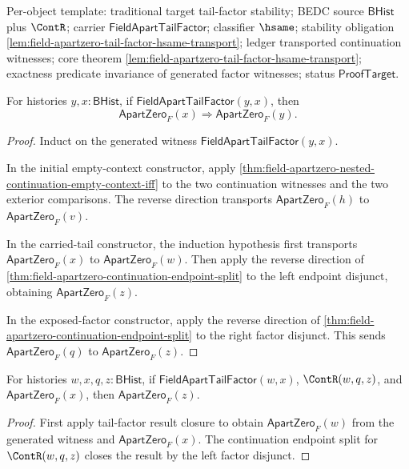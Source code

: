 
Per-object template: traditional target tail-factor stability; BEDC source
$\mathsf{BHist}$ plus $\ContR$; carrier $\mathsf{FieldApartTailFactor}$;
classifier $\hsame$; stability obligation
\autoref{lem:field-apartzero-tail-factor-hsame-transport}; ledger transported
continuation witnesses; core theorem
\autoref{lem:field-apartzero-tail-factor-hsame-transport}; exactness predicate invariance of generated factor witnesses; status $\mathsf{ProofTarget}$.


\begin{lemma}
\label{lem:field-apartzero-tail-factor-result-closure}
For histories $y,x:\mathsf{BHist}$, if
$\mathsf{FieldApartTailFactor}(y,x)$, then
$$
\mathsf{ApartZero}_F(x)\Rightarrow\mathsf{ApartZero}_F(y).
$$
\end{lemma}
\begin{proof}
Induct on the generated witness
$\mathsf{FieldApartTailFactor}(y,x)$.

In the initial empty-context constructor, apply
\autoref{thm:field-apartzero-nested-continuation-empty-context-iff} to the
two continuation witnesses and the two exterior comparisons. The reverse
direction transports $\mathsf{ApartZero}_F(h)$ to
$\mathsf{ApartZero}_F(v)$.

In the carried-tail constructor, the induction hypothesis first transports
$\mathsf{ApartZero}_F(x)$ to $\mathsf{ApartZero}_F(w)$. Then apply the
reverse direction of
\autoref{thm:field-apartzero-continuation-endpoint-split} to the left
endpoint disjunct, obtaining $\mathsf{ApartZero}_F(z)$.

In the exposed-factor constructor, apply the reverse direction of
\autoref{thm:field-apartzero-continuation-endpoint-split} to the right factor
disjunct. This sends $\mathsf{ApartZero}_F(q)$ to
$\mathsf{ApartZero}_F(z)$.
\end{proof}

\begin{theorem}
\label{thm:field-aparttailfactor-continuation-result-closure}
For histories $w,x,q,z:\mathsf{BHist}$, if
$\mathsf{FieldApartTailFactor}(w,x)$, $\ContR(w,q,z)$, and
$\mathsf{ApartZero}_F(x)$, then $\mathsf{ApartZero}_F(z)$.
\end{theorem}
\begin{proof}
First apply tail-factor result closure to obtain $\mathsf{ApartZero}_F(w)$
from the generated witness and $\mathsf{ApartZero}_F(x)$. The continuation
endpoint split for $\ContR(w,q,z)$ closes the result by the left factor
disjunct.
\end{proof}

